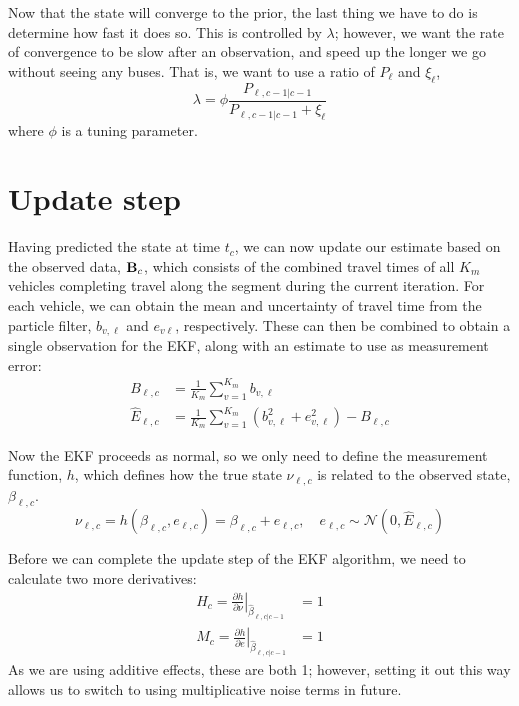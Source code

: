 \documentclass[english]{MastersDoctoralThesis}\usepackage[]{graphicx}\usepackage[]{color}
\begin{document}
Now that the state will converge to the prior,
the last thing we have to do is determine how fast it does so.
This is controlled by $\lambda$;
however, we want the rate of convergence to be slow
after an observation, and speed up the longer we go without seeing any buses.
That is, we want to use a ratio of $P_\ell$ and $\xi_\ell$,
\begin{equation}
    \label{eq:kf_transition_lambda}
    \lambda = \phi \frac{P_{\ell,c-1|c-1}}{P_{\ell,c-1|c-1} + \xi_\ell}
\end{equation}
where $\phi$ is a tuning parameter.



\section{Update step}

Having predicted the state at time $t_c$,
we can now update our estimate based on the observed data,
$\mathbf{B}_c$, which consists of the combined travel times
of all $K_m$ vehicles completing travel along the segment
during the current iteration.
For each vehicle, we can obtain the mean and uncertainty
of travel time from the particle filter,
$b_{v,\ell}$ and $e_{v\ell}$, respectively.
These can then be combined to obtain a single observation for the EKF,
along with an estimate to use as measurement error:
\begin{align}
    \label{eq:kf_update_B}
    B_{\ell,c} &= \frac{1}{K_m} \sum_{v=1}^{K_m} b_{v,\ell} \\
    \label{eq:kf_update_E}
    \hat E_{\ell,c} &= \frac{1}{K_m} \sum_{v=1}^{K_m}
        \left(b_{v,\ell}^2 + e_{v,\ell}^2\right) - B_{\ell,c}
\end{align}

Now the EKF proceeds as normal,
so we only need to define the measurement function, $h$,
which defines how the true state $\nu_{\ell,c}$ is related to the observed state, $\beta_{\ell,c}$.
\begin{equation}
    \label{eq:kf_measure}
    \nu_{\ell,c} = h(\beta_{\ell,c}, e_{\ell,c}) = \beta_{\ell,c} + e_{\ell,c},
    \quad e_{\ell,c}\sim \mathcal{N}(0, \hat E_{\ell,c})
\end{equation}

Before we can complete the update step of the EKF algorithm, we need to calculate two more derivatives:
\begin{align}
    \label{eq:kf_update_H}
    H_c = \left.\frac{\partial h}{\partial \nu}\right|_{\hat\beta_{\ell,c|c-1}} &= 1 \\
    M_c = \left.\frac{\partial h}{\partial e}\right|_{\hat\beta_{\ell,c|c-1}} &= 1
\end{align}
As we are using additive effects, these are both 1;
however, setting it out this way allows us to switch to using multiplicative
noise terms in future.
\end{document}

